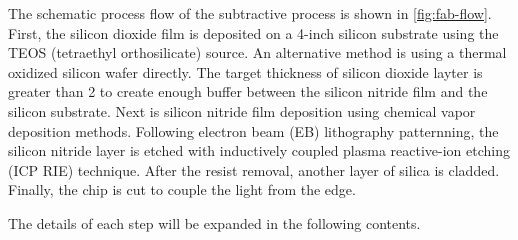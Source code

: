 The schematic process flow of the subtractive process is shown in \autoref{fig:fab-flow}. First, the silicon dioxide film is deposited on a 4-inch silicon substrate using the TEOS  (tetraethyl orthosilicate) source.
An alternative method is using a thermal oxidized silicon wafer directly. The target thickness of silicon dioxide layter is greater than 2 \um to create enough buffer between the silicon nitride film and the silicon substrate. 
Next is silicon nitride film deposition using chemical vapor deposition methods. Following electron beam (EB) lithography patternning, the silicon nitride layer is etched with inductively coupled plasma reactive-ion etching (ICP RIE) technique. After the resist removal, another layer of silica is cladded. Finally, the chip is cut to couple the light from the edge. 

The details of each step will be expanded in the following contents.


